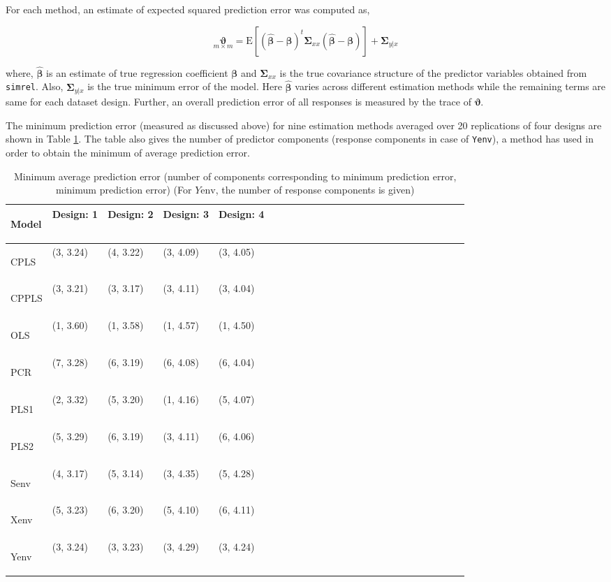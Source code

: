 \documentclass[review]{elsarticle}
\theoremstyle{definition}
\theoremstyle{definition}
\theoremstyle{remark}
\begin{document}
For each method, an estimate of expected squared prediction error was
computed as,

\[\underset{m \times m}{\boldsymbol{\vartheta}} = 
\mathrm{E}\left[\left(
\hat{\boldsymbol{\beta}} - \boldsymbol{\beta}
\right) ^t \boldsymbol{\Sigma}_{xx}
\left(
\hat{\boldsymbol{\beta}} - \boldsymbol{\beta}
\right)\right] + \boldsymbol{\Sigma}_{y|x}\]

where, \(\hat{\boldsymbol{\beta}}\) is an estimate of true regression
coefficient \(\boldsymbol{\beta}\) and \(\boldsymbol{\Sigma}_{xx}\) is
the true covariance structure of the predictor variables obtained from
\texttt{simrel}. Also, \(\boldsymbol{\Sigma}_{y|x}\) is the true minimum
error of the model. Here \(\hat{\boldsymbol{\beta}}\) varies across
different estimation methods while the remaining terms are same for each
dataset design. Further, an overall prediction error of all responses is
measured by the trace of \(\boldsymbol{\vartheta}\).

The minimum prediction error (measured as discussed above) for nine
estimation methods averaged over 20 replications of four designs are
shown in Table \ref{tab:min-error}. The table also gives the number of
predictor components (response components in case of \texttt{Yenv}), a
method has used in order to obtain the minimum of average prediction
error.


\begin{table}

\caption{\label{tab:min-error}Minimum average prediction error 
      (number of components corresponding to minimum prediction error, minimum prediction error) 
      (For $Y\text{env}$, the number of response components is given)}
\centering
\begin{tabular}[t]{>{\bfseries\raggedright\arraybackslash}p{7em}>{\ttfamily\centering\arraybackslash}p{6em}>{\ttfamily\centering\arraybackslash}p{6em}>{\ttfamily\centering\arraybackslash}p{6em}>{\ttfamily\centering\arraybackslash}p{6em}lcccclcccclcccclcccc}
\toprule
\bfseries{Model} & \bfseries{Design: 1} & \bfseries{Design: 2} & \bfseries{Design: 3} & \bfseries{Design: 4}\\
\midrule
CPLS & (3, 3.24) & (4, 3.22) & (3, 4.09) & (3, 4.05)\\
CPPLS & (3, 3.21) & (3, 3.17) & (3, 4.11) & (3, 4.04)\\
OLS & (1, 3.60) & (1, 3.58) & (1, 4.57) & (1, 4.50)\\
PCR & (7, 3.28) & (6, 3.19) & (6, 4.08) & (6, 4.04)\\
PLS1 & (2, 3.32) & (5, 3.20) & (1, 4.16) & (5, 4.07)\\
\addlinespace
PLS2 & (5, 3.29) & (6, 3.19) & (3, 4.11) & (6, 4.06)\\
Senv & (4, 3.17) & (5, 3.14) & (3, 4.35) & (5, 4.28)\\
Xenv & (5, 3.23) & (6, 3.20) & (5, 4.10) & (6, 4.11)\\
Yenv & (3, 3.24) & (3, 3.23) & (3, 4.29) & (3, 4.24)\\
\bottomrule
\end{tabular}
\end{table}
\end{document}

